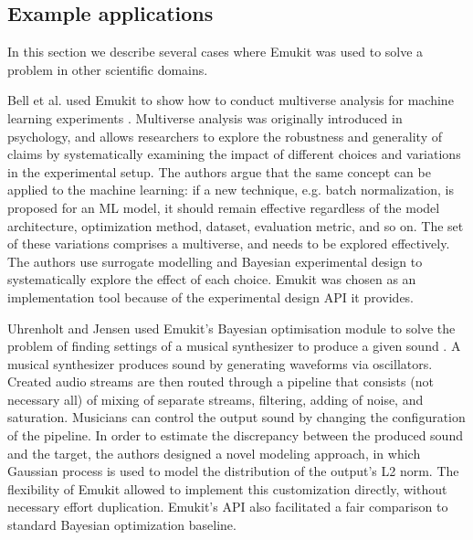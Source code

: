  

\subsection{Example applications}
In this section we describe several cases where Emukit was used to solve a problem in other scientific domains.

Bell et al. used Emukit to show how to conduct multiverse analysis for machine learning experiments \cite{bell2022modeling}. Multiverse analysis was originally introduced in psychology, and allows researchers to explore the robustness and generality of claims by systematically examining the impact of different choices and variations in the experimental setup. The authors argue that the same concept can be applied to the machine learning: if a new technique, e.g. batch normalization, is proposed for an ML model, it should remain effective regardless of the model architecture, optimization method, dataset, evaluation metric, and so on. The set of these variations comprises a multiverse, and needs to be explored effectively. The authors use surrogate modelling and Bayesian experimental design to systematically explore the effect of each choice. Emukit was chosen as an implementation tool because of the experimental design API it provides.

Uhrenholt and Jensen used Emukit's Bayesian optimisation module to solve the problem of finding settings of a musical synthesizer to produce a given sound \cite{uhrenholt2019efficient}. A musical synthesizer produces sound by generating waveforms via oscillators. Created audio streams are then routed through a pipeline that consists (not necessary all) of mixing of separate streams, filtering, adding of noise, and saturation. Musicians can control the output sound by changing the configuration of the pipeline. In order to estimate the discrepancy between the produced sound and the target, the authors designed a novel modeling approach, in which Gaussian process is used to model the distribution of the output's L2 norm. The flexibility of Emukit allowed to implement this customization directly, without necessary effort duplication. Emukit's API also facilitated a fair comparison to standard Bayesian optimization baseline.

